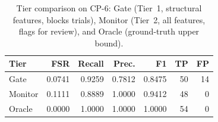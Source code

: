 \begin{table}[htbp]
\centering
\caption{Tier comparison on CP-6: Gate (Tier~1, structural features, blocks trials), Monitor (Tier~2, all features, flags for review), and Oracle (ground-truth upper bound).}
\label{tab:tier_comparison}
\small
\begin{tabular}{lrrrrrr}
\toprule
Tier & FSR & Recall & Prec. & F1 & TP & FP \\
\midrule
Gate & 0.0741 & 0.9259 & 0.7812 & 0.8475 & 50 & 14 \\
Monitor & 0.1111 & 0.8889 & 1.0000 & 0.9412 & 48 & 0 \\
Oracle & 0.0000 & 1.0000 & 1.0000 & 1.0000 & 54 & 0 \\
\bottomrule
\end{tabular}
\end{table}